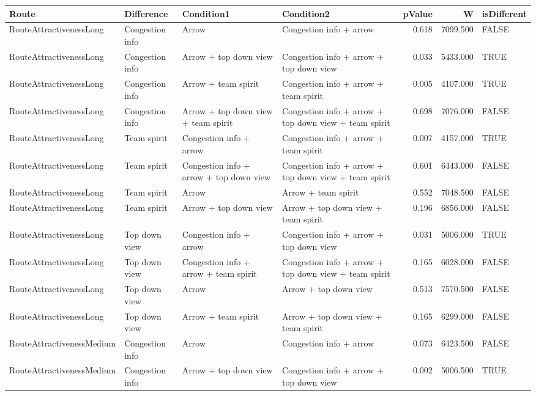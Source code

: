 \begin{tabular}{llllrrl}
  \hline
Route & Difference & Condition1 & Condition2 & pValue & W & isDifferent \\ 
  \hline
RouteAttractivenessLong & Congestion info & Arrow & Congestion info + arrow & 0.618 & 7099.500 & FALSE \\ 
  RouteAttractivenessLong & Congestion info & Arrow + top down view & Congestion info + arrow + top down view & 0.033 & 5433.000 & TRUE \\ 
  RouteAttractivenessLong & Congestion info & Arrow + team spirit & Congestion info + arrow + team spirit & 0.005 & 4107.000 & TRUE \\ 
  RouteAttractivenessLong & Congestion info & Arrow + top down view + team spirit & Congestion info + arrow + top down view + team spirit & 0.698 & 7076.000 & FALSE \\ 
  RouteAttractivenessLong & Team spirit & Congestion info + arrow & Congestion info + arrow + team spirit & 0.007 & 4157.000 & TRUE \\ 
  RouteAttractivenessLong & Team spirit & Congestion info + arrow + top down view & Congestion info + arrow + top down view + team spirit & 0.601 & 6443.000 & FALSE \\ 
  RouteAttractivenessLong & Team spirit & Arrow & Arrow + team spirit & 0.552 & 7048.500 & FALSE \\ 
  RouteAttractivenessLong & Team spirit & Arrow + top down view & Arrow + top down view + team spirit & 0.196 & 6856.000 & FALSE \\ 
  RouteAttractivenessLong & Top down view & Congestion info + arrow & Congestion info + arrow + top down view & 0.031 & 5006.000 & TRUE \\ 
  RouteAttractivenessLong & Top down view & Congestion info + arrow + team spirit & Congestion info + arrow + top down view + team spirit & 0.165 & 6028.000 & FALSE \\ 
  RouteAttractivenessLong & Top down view & Arrow & Arrow + top down view & 0.513 & 7570.500 & FALSE \\ 
  RouteAttractivenessLong & Top down view & Arrow + team spirit & Arrow + top down view + team spirit & 0.165 & 6299.000 & FALSE \\ 
  RouteAttractivenessMedium & Congestion info & Arrow & Congestion info + arrow & 0.073 & 6423.500 & FALSE \\ 
  RouteAttractivenessMedium & Congestion info & Arrow + top down view & Congestion info + arrow + top down view & 0.002 & 5006.500 & TRUE \\ 

\end{tabular}

